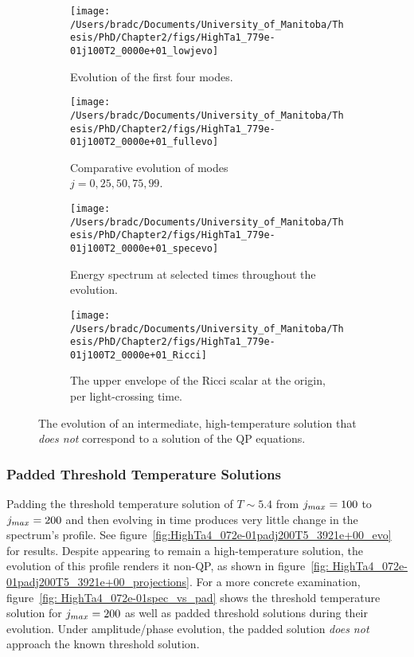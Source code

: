 \documentclass[../PhD.tex]{subfiles}
\begin{document}
\begin{figure}[h]
	\centering
	\begin{subfigure}[t]{0.45\textwidth}
		\texttt{[image: /Users/bradc/Documents/University\_of\_Manitoba/Thesis/PhD/Chapter2/figs/HighTa1\_779e-01j100T2\_0000e+01\_lowjevo]}
		\caption{Evolution of the first four modes.}
	\end{subfigure}
	\;
	\begin{subfigure}[t]{0.45\textwidth}
		\texttt{[image: /Users/bradc/Documents/University\_of\_Manitoba/Thesis/PhD/Chapter2/figs/HighTa1\_779e-01j100T2\_0000e+01\_fullevo]}
		\caption{Comparative evolution of modes\\ $j=0, 25, 50, 75, 99$.}
	\end{subfigure}
	\;
	\begin{subfigure}[t]{0.45\textwidth}
		\texttt{[image: /Users/bradc/Documents/University\_of\_Manitoba/Thesis/PhD/Chapter2/figs/HighTa1\_779e-01j100T2\_0000e+01\_specevo]}
		\caption{Energy spectrum at selected times throughout the evolution.}
	\end{subfigure}
	\;
	\begin{subfigure}[t]{0.45\textwidth}
		\texttt{[image: /Users/bradc/Documents/University\_of\_Manitoba/Thesis/PhD/Chapter2/figs/HighTa1\_779e-01j100T2\_0000e+01\_Ricci]}
		\caption{The upper envelope of the Ricci scalar at the origin, per light-crossing time.}
	\end{subfigure}
	\caption{The evolution of an intermediate, high-temperature solution that \emph{does not} correspond to a solution of the QP equations.}
	\label{fig:HighTa1_779e-01j100T2_0000e+01evo}
\end{figure}


\subsubsection{Padded Threshold Temperature Solutions}

Padding the threshold temperature solution of $T \sim 5.4$ from $j_{max} = 100$ to $j_{max} = 200$ and then evolving in time produces very little change in the spectrum's profile. See figure~\ref{fig:HighTa4_072e-01padj200T5_3921e+00_evo} for results. Despite appearing to remain a high-temperature solution, the evolution of this profile renders it non-QP, as shown in figure~\ref{fig: HighTa4_072e-01padj200T5_3921e+00_projections}. For a more concrete examination, figure~\ref{fig: HighTa4_072e-01spec_vs_pad} shows the threshold temperature solution for $j_{max} = 200$ as well as padded threshold solutions during their evolution. Under amplitude/phase evolution, the padded solution \emph{does not} approach the known threshold solution.
\end{document}
